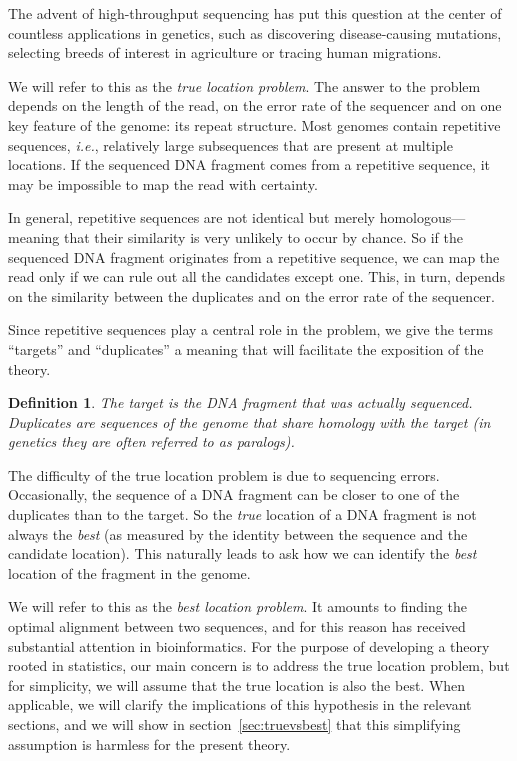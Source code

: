 \documentclass{article}
\newtheorem{definition}{Definition}
\begin{document}
The advent of high-throughput sequencing has put this question at the
center of countless applications in genetics, such as discovering
disease-causing mutations, selecting breeds of interest in agriculture or
tracing human migrations.

We will refer to this as the \emph{true location problem}. The answer to
the problem depends on the length of the read, on the error rate of the
sequencer and on one key feature of the genome: its repeat structure.
Most genomes contain repetitive sequences, \textit{i.e.}, relatively large
subsequences that are present at multiple locations. If the sequenced DNA
fragment comes from a repetitive sequence, it may be impossible to map the
read with certainty.

In general, repetitive sequences are not identical but merely
homologous---meaning that their similarity is very unlikely to occur by
chance. So if the sequenced DNA fragment originates from a repetitive
sequence, we can map the read only if we can rule out all the candidates
except one. This, in turn, depends on the similarity between the
duplicates and on the error rate of the sequencer.

Since repetitive sequences play a central role in the problem, we give the
terms ``targets'' and ``duplicates'' a meaning that will facilitate the
exposition of the theory.

\begin{definition}
The target is the DNA fragment that was actually sequenced. Duplicates are
sequences of the genome that share homology with the target (in genetics
they are often referred to as paralogs).
\end{definition}

The difficulty of the true location problem is due to sequencing errors.
Occasionally, the sequence of a DNA fragment can be closer to one of the
duplicates than to the target. So the \emph{true} location of a DNA
fragment is not always the \emph{best} (as measured by the identity
between the sequence and the candidate location). This naturally leads to
ask how we can identify the \emph{best} location of the fragment in
the genome.

We will refer to this as the \emph{best location problem}. It amounts to
finding the optimal alignment between two sequences, and for this reason
has received substantial attention in bioinformatics. For the purpose of
developing a theory rooted in statistics, our main concern is to address
the true location problem, but for simplicity, we will assume that the
true location is also the best. When applicable, we will clarify the
implications of this hypothesis in the relevant sections, and we will show
in section~\ref{sec:truevsbest} that this simplifying assumption is harmless for
the present theory.
\end{document}
